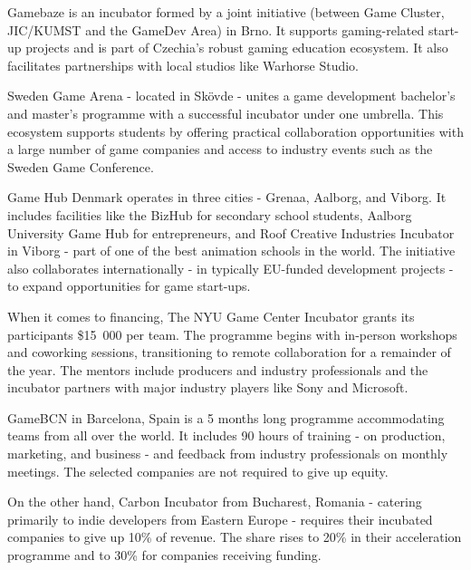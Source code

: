 Gamebaze is an incubator formed by a joint initiative (between Game Cluster, JIC/KUMST and the GameDev Area) in Brno. It supports gaming-related start-up projects and is part of Czechia's robust gaming education ecosystem. It also facilitates partnerships with local studios like Warhorse Studio.

Sweden Game Arena - located in Skövde - unites a game development bachelor's and master's programme with a successful incubator under one umbrella. This ecosystem supports students by offering practical collaboration opportunities with a large number of game companies and access to industry events such as the Sweden Game Conference.

Game Hub Denmark operates in three cities - Grenaa, Aalborg, and Viborg. It includes facilities like the BizHub for secondary school students, Aalborg University Game Hub for entrepreneurs, and Roof Creative Industries Incubator in Viborg - part of one of the best animation schools in the world. The initiative also collaborates internationally - in typically EU-funded development projects - to expand opportunities for game start-ups.

When it comes to financing, The NYU Game Center Incubator grants its participants \$15~000 per team. The programme begins with in-person workshops and coworking sessions, transitioning to remote collaboration for a remainder of the year. The mentors include producers and industry professionals and the incubator partners with major industry players like Sony and Microsoft.

GameBCN in Barcelona, Spain is a 5 months long programme accommodating teams from all over the world. It includes 90 hours of training - on production, marketing, and business - and feedback from industry professionals on monthly meetings. The selected companies are not required to give up equity.

On the other hand, Carbon Incubator from Bucharest, Romania - catering primarily to indie developers from Eastern Europe - requires their incubated companies to give up 10\% of revenue. The share rises to 20\% in their acceleration programme and to 30\% for companies receiving funding.
